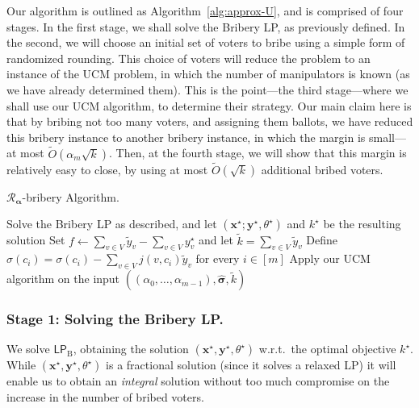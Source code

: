 \documentclass[letterpaper]{article} %
\theoremstyle{definition}
\newcommand\vecc{\mathbf}
\newcommand\vecgreek{\bm}
\newcommand{\veca}{\vecgreek{\alpha}}
\newcommand{\Ra}{\mathcal{R}_{\veca}}
\newcommand{\LPB}{\mathsf{LP}_{\mathrm{B}}}
\begin{document}
Our algorithm is outlined as Algorithm~\ref{alg:approx-U}, and is comprised of four stages. In the first stage, we shall solve the Bribery LP, as previously defined. In the second, we will choose an initial set of voters to bribe using a simple form of randomized rounding. 
This choice of voters will reduce the problem to an instance of the UCM problem, in which the number of manipulators is known (as we have already determined them). This is the point---the third stage---where we shall use our UCM algorithm, to determine their strategy. Our main claim here is that by bribing not too many voters, and assigning them ballots, we have reduced this bribery instance to another bribery instance, in which the margin is small---at most $\widetilde{O}(\alpha_{m}\sqrt{k})$. Then, at the fourth stage, we will show that this margin is relatively easy to close, by using at most $\widetilde{O}(\sqrt{k})$ additional bribed voters.
\begin{algorithm}[t]
	\caption{$\Ra$-bribery Algorithm.}
	\label{alg:approx-U}
	Solve the Bribery LP as described, and let $(\vecc{x^\star };\vecc{y^\star },\theta^\star )$ and $k^\star$ be the resulting solution\;
	Set $f \gets \sum_{v \in V}\tilde{y}_v - \sum_{v \in V} y^\star _v$ and let $\tilde{k}=\sum_{v \in V} \tilde{y}_v$\;
	Define  $\hat{\sigma}(c_i)= \sigma(c_i) - \sum_{v \in V}j(v,c_i) \tilde{y}_{v}$ for every $i \in [m]$\;
	Apply our UCM algorithm on the input $((\alpha_{0},\ldots,\alpha_{m-1}),\vecgreek{\hat{\sigma}}, \tilde{k})$ \;
\end{algorithm}


\subsubsection{Stage 1: Solving the Bribery LP.}
We solve $\LPB$, obtaining the solution $(\vecc{x^\star },\vecc{y^\star },\theta^\star )$ w.r.t.\ the optimal objective $k^\star $. While $(\vecc{x^\star },\vecc{y^\star },\theta^\star )$ is a fractional solution (since it solves a relaxed LP) it will enable us to obtain an \emph{integral} solution without too much compromise on the increase in the number of bribed voters.
\end{document}
